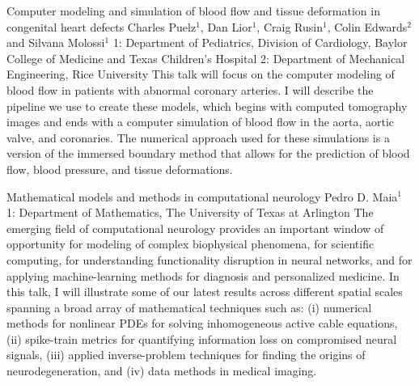 \begin{addmargin}[2em]{0em}
\vspace{1.5ex}
\abs
{Computer modeling and simulation of blood flow and tissue deformation in congenital heart defects}
{Charles Puelz$^{1}$, Dan Lior$^{1}$, Craig Rusin$^{1}$, Colin Edwards$^{2}$ and Silvana Molossi$^{1}$}
{1: Department of Pediatrics, Division of Cardiology, Baylor College of Medicine and Texas Children's Hospital 2: Department of Mechanical Engineering, Rice University}
{This talk will focus on the computer modeling of blood flow in patients with abnormal coronary arteries. I will describe the pipeline we use to create these models, which begins with computed tomography images and ends with a computer simulation of blood flow in the aorta, aortic valve, and coronaries. The numerical approach used for these simulations is a version of the immersed boundary method that allows for the prediction of blood flow, blood pressure, and tissue deformations.}


\vspace{1.5ex}
\abs
{Mathematical models and methods in computational neurology}
{Pedro D. Maia$^{1}$}
{1: Department of Mathematics, The University of Texas at Arlington}
{The emerging field of computational neurology provides an important window of opportunity for modeling of complex biophysical phenomena, for scientific computing, for understanding functionality disruption in neural networks, and for applying machine-learning methods for diagnosis and personalized medicine. In this talk, I will illustrate some of our latest results across different spatial scales spanning a broad array of mathematical techniques such as: (i) numerical methods for nonlinear PDEs for solving inhomogeneous active cable equations, (ii) spike-train metrics for quantifying information loss on compromised neural signals, (iii) applied inverse-problem techniques for finding the origins of neurodegeneration, and (iv) data methods in medical imaging.}



\end{addmargin}

